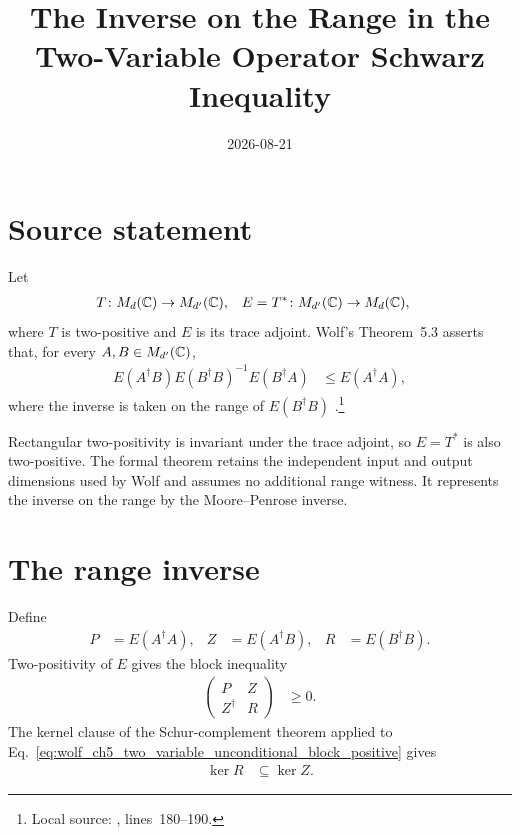 \documentclass{article}
\title{The Inverse on the Range in the Two-Variable Operator Schwarz Inequality}
\author{}
\date{2026-08-21}
\begin{document}
\maketitle
{}

\section{Source statement}

Let
\begin{align}
    T&\colon M_{d}(\mathbb{C})\to M_{d'}(\mathbb{C}),
    &
    E=T^*&\colon M_{d'}(\mathbb{C})\to M_{d}(\mathbb{C}),
    \label{eq:wolf_ch5_two_variable_unconditional_maps}
\end{align}
where $T$ is two-positive and $E$ is its trace adjoint. Wolf's Theorem~5.3
asserts that, for every $A,B\in M_{d'}(\mathbb{C})$,
\begin{align}
    E(A^\dagger B)
    E(B^\dagger B)^{-1}
    E(B^\dagger A)
        &\leq E(A^\dagger A),
    \label{eq:wolf_ch5_two_variable_unconditional_source_inequality}
\end{align}
where the inverse is taken on the range of $E(B^\dagger B)$
\cite[Chapter~5, Theorem~5.3]{Wolf2012Quantum}.\footnote{Local source:
,
lines~180--190.}

Rectangular two-positivity is invariant under the trace adjoint, so $E=T^*$ is
also two-positive. The formal theorem retains the independent input and output
dimensions used by Wolf and assumes no additional range witness. It represents
the inverse on the range by the Moore--Penrose inverse.

\section{The range inverse}

Define
\begin{align}
    P&=E(A^\dagger A),
    &
    Z&=E(A^\dagger B),
    &
    R&=E(B^\dagger B).
    \label{eq:wolf_ch5_two_variable_unconditional_block_entries}
\end{align}
Two-positivity of $E$ gives the block inequality
\begin{align}
    \begin{pmatrix}
        P&Z\\
        Z^\dagger&R
    \end{pmatrix}
        &\geq 0.
    \label{eq:wolf_ch5_two_variable_unconditional_block_positive}
\end{align}
The kernel clause of the Schur-complement theorem applied to
Eq.~\ref{eq:wolf_ch5_two_variable_unconditional_block_positive} gives
\begin{align}
    \ker R&\subseteq\ker Z.
    \label{eq:wolf_ch5_two_variable_unconditional_kernel_inclusion}
\end{align}
\end{document}
